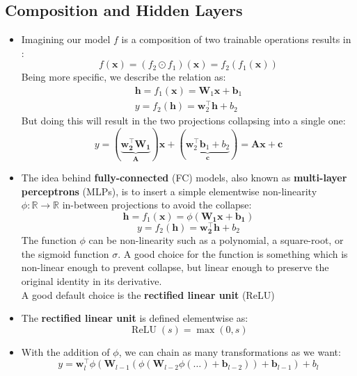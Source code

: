 \documentclass{article}
\newcommand{\tbf}[1]{\textbf{#1}}
\newcommand{\mbf}[1]{\mathbf{#1}}
\begin{document}
    \subsection{Composition and Hidden Layers}
    \begin{itemize}
        \item Imagining our model $f$ is a composition of two trainable operations results in : 
        \[f(\mbf{x}) = (f_2 \odot f_1)(\mbf{x}) = f_2(f_1(\mbf{x}))\]
        Being more specific, we describe the relation as:
        \begin{align*}
            \mbf{h} = f_1(\mbf{x}) = \mbf{W}_1\mbf{x} + \mbf{b}_1 \\
            y = f_2(\mbf{h}) = \mbf{w}_2^\top \mbf{h} + b_2
        \end{align*}
        But doing this will result in the two projections collapsing into a single one:
        \[y = (\underbrace{\mbf{w_2 ^\top \mbf{W}_1}}_{\mbf{A}}) \mbf{x} 
        + (\underbrace{\mbf{w}_2 ^\top \mbf{b}_1 + b_2}_{\mbf{c}}) 
        = \mbf{Ax+c}\]
        \item The idea behind \tbf{fully-connected} (FC) models, also known as \tbf{multi-layer perceptrons} (MLPs), is to insert a 
        simple elementwise non-linearity $\phi: \mathbb{R} \rightarrow \mathbb{R}$ in-between projections to avoid the collapse:
        \[\mbf{h} = f_1(\mbf{x}) = \phi(\mbf{W_1x + b_1})\]
        \[y = f_2(\mbf{h}) = \mbf{w_2 ^\top h} + b_2\]
        The function $\phi$ can be non-linearity such as a polynomial, a square-root, or the sigmoid function $\sigma$. 
        A good choice for the function is something which is non-linear enough to prevent collapse, but linear enough to preserve the original identity in its derivative. \\
    
        A good default choice is the \tbf{rectified linear unit} (ReLU)
        \item The \tbf{rectified linear unit} is defined elementwise as:
        \[\operatorname{ReLU}(s) = \operatorname{max}(0,s)\]
        \item With the addition of $\phi$, we can chain as many transformations as we want:
        \[y = \mbf{w}_l ^\top \phi (\mbf{W} _{l - 1}(\phi (\mbf{W}_{l-2} \phi (\hdots) + \mbf{b}_{l-2}))+\mbf{b}_{l-1})+b_l\]
        \end{itemize}
        
\end{document}
